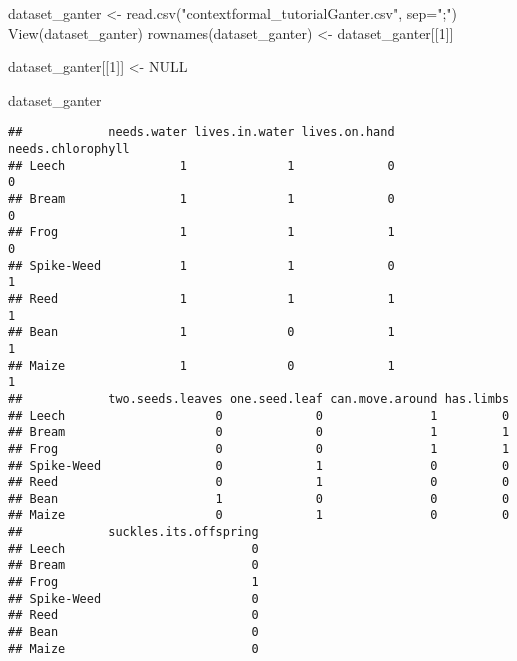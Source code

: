 \documentclass[
]{book}
\newenvironment{Shaded}{\begin{snugshade}}{\end{snugshade}}
\newcommand{\AttributeTok}[1]{\textcolor[rgb]{0.77,0.63,0.00}{#1}}
\newcommand{\ConstantTok}[1]{\textcolor[rgb]{0.00,0.00,0.00}{#1}}
\newcommand{\DecValTok}[1]{\textcolor[rgb]{0.00,0.00,0.81}{#1}}
\newcommand{\FunctionTok}[1]{\textcolor[rgb]{0.00,0.00,0.00}{#1}}
\newcommand{\NormalTok}[1]{#1}
\newcommand{\OtherTok}[1]{\textcolor[rgb]{0.56,0.35,0.01}{#1}}
\newcommand{\SpecialCharTok}[1]{\textcolor[rgb]{0.00,0.00,0.00}{#1}}
\newcommand{\StringTok}[1]{\textcolor[rgb]{0.31,0.60,0.02}{#1}}
\begin{document}
\begin{Shaded}
\begin{Highlighting}[]
\NormalTok{dataset\_ganter }\OtherTok{\textless{}{-}} \FunctionTok{read.csv}\NormalTok{(}\StringTok{"contextformal\_tutorialGanter.csv"}\NormalTok{, }\AttributeTok{sep=}\StringTok{";"}\NormalTok{)}
\FunctionTok{View}\NormalTok{(dataset\_ganter)}
\FunctionTok{rownames}\NormalTok{(dataset\_ganter) }\OtherTok{\textless{}{-}}\NormalTok{ dataset\_ganter[[}\DecValTok{1}\NormalTok{]]}

\NormalTok{dataset\_ganter[[}\DecValTok{1}\NormalTok{]] }\OtherTok{\textless{}{-}} \ConstantTok{NULL}

\NormalTok{dataset\_ganter}
\end{Highlighting}
\end{Shaded}

\begin{verbatim}
##            needs.water lives.in.water lives.on.hand needs.chlorophyll
## Leech                1              1             0                 0
## Bream                1              1             0                 0
## Frog                 1              1             1                 0
## Spike-Weed           1              1             0                 1
## Reed                 1              1             1                 1
## Bean                 1              0             1                 1
## Maize                1              0             1                 1
##            two.seeds.leaves one.seed.leaf can.move.around has.limbs
## Leech                     0             0               1         0
## Bream                     0             0               1         1
## Frog                      0             0               1         1
## Spike-Weed                0             1               0         0
## Reed                      0             1               0         0
## Bean                      1             0               0         0
## Maize                     0             1               0         0
##            suckles.its.offspring
## Leech                          0
## Bream                          0
## Frog                           1
## Spike-Weed                     0
## Reed                           0
## Bean                           0
## Maize                          0
\end{verbatim}

\begin{Shaded}
\end{Shaded}
\end{document}
